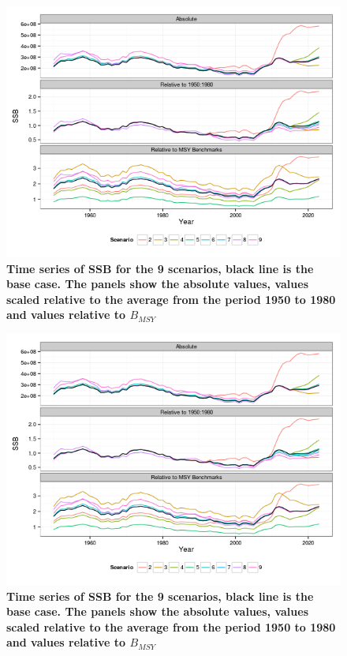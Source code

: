 \documentclass[a4paper, 10pt]{article}
\begin{document}
\begin{figure}[!ht]\begin{center} 
\includegraphics{../figs/om-ssb.png}
\end{center}
\caption{\bf{Time series of SSB for the 9 scenarios, black line is the base case. The panels show the absolute values, values scaled relative to 
the average from the period 1950 to 1980 and values relative to $B_{MSY}$}}
\label{map}\end{figure} 

\begin{figure}[!ht]\begin{center} 
\includegraphics{../figs/om-ssb.png}
\end{center}
\caption{\bf{Time series of SSB for the 9 scenarios, black line is the base case. The panels show the absolute values, values scaled relative to 
the average from the period 1950 to 1980 and values relative to $B_{MSY}$}}
\label{ts-ssb}\end{figure} 
\end{document}
